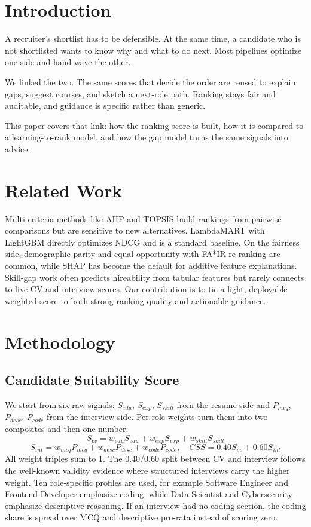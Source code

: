 \documentclass[conference]{IEEEtran}
\begin{document}
\section{Introduction}
A recruiter's shortlist has to be defensible. At the same time, a candidate who is not shortlisted wants to know why and what to do next. Most pipelines optimize one side and hand-wave the other.

We linked the two. The same scores that decide the order are reused to explain gaps, suggest courses, and sketch a next-role path. Ranking stays fair and auditable, and guidance is specific rather than generic.

This paper covers that link: how the ranking score is built, how it is compared to a learning-to-rank model, and how the gap model turns the same signals into advice.

\section{Related Work}
Multi-criteria methods like AHP and TOPSIS build rankings from pairwise comparisons but are sensitive to new alternatives. LambdaMART with LightGBM directly optimizes NDCG and is a standard baseline. On the fairness side, demographic parity and equal opportunity with FA*IR re-ranking are common, while SHAP has become the default for additive feature explanations. Skill-gap work often predicts hireability from tabular features but rarely connects to live CV and interview scores. Our contribution is to tie a light, deployable weighted score to both strong ranking quality and actionable guidance.

\section{Methodology}

\subsection{Candidate Suitability Score}
We start from six raw signals: $S_{edu}$, $S_{exp}$, $S_{skill}$ from the resume side and $P_{mcq}$, $P_{desc}$, $P_{code}$ from the interview side. Per-role weights turn them into two composites and then one number:
\begin{equation}
S_{cv} = w_{edu}S_{edu} + w_{exp}S_{exp} + w_{skill}S_{skill}
\end{equation}
\begin{equation}
S_{int} = w_{mcq}P_{mcq} + w_{desc}P_{desc} + w_{code}P_{code}, \quad CSS = 0.40S_{cv} + 0.60S_{int}
\end{equation}
All weight triples sum to 1. The 0.40/0.60 split between CV and interview follows the well-known validity evidence where structured interviews carry the higher weight. Ten role-specific profiles are used, for example Software Engineer and Frontend Developer emphasize coding, while Data Scientist and Cybersecurity emphasize descriptive reasoning. If an interview had no coding section, the coding share is spread over MCQ and descriptive pro-rata instead of scoring zero.
\end{document}

